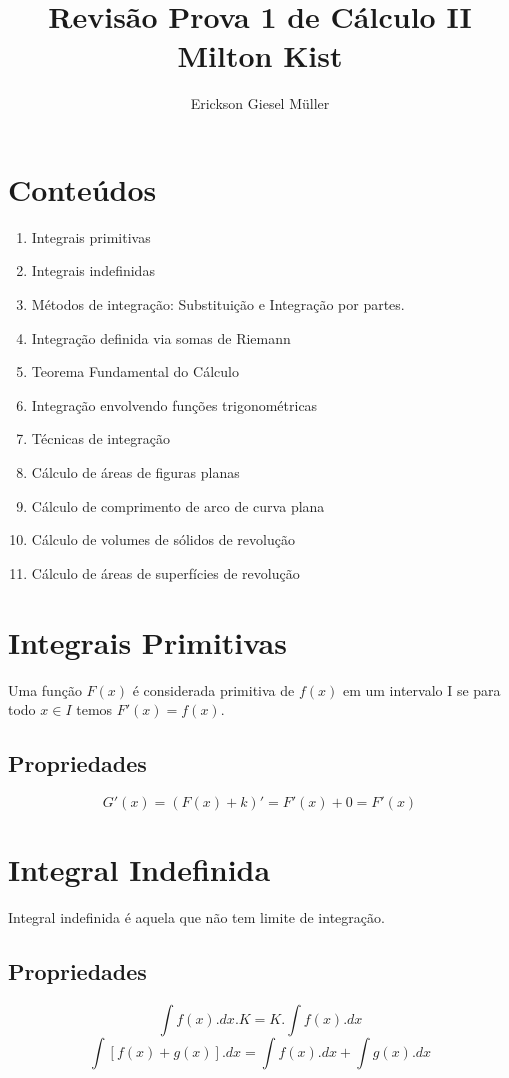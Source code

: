 \documentclass{article}
\title{Revisão Prova 1 de Cálculo II\\Milton Kist}
\author{Erickson Giesel Müller}
\begin{document}
	\maketitle
	
	\section{Conteúdos}
		\begin{enumerate}
			\item Integrais primitivas
			\item Integrais indefinidas
			\item Métodos de integração: Substituição e Integração por partes.
			\item Integração definida via somas de Riemann
			\item Teorema Fundamental do Cálculo
			\item Integração envolvendo funções trigonométricas
			\item Técnicas de integração
			\item Cálculo de áreas de figuras planas
			\item Cálculo de comprimento de arco de curva plana
			\item Cálculo de volumes de sólidos de revolução
			\item Cálculo de áreas de superfícies de revolução
		\end{enumerate}
	\newpage
	\section{Integrais Primitivas}
		Uma função $F(x)$ é considerada primitiva de $f(x)$ em um intervalo I se para todo $x \in I$ temos $F'(x)=f(x)$.
		\subsection{Propriedades}
			$$G'(x)=(F(x)+k)' = F'(x)+0=F'(x)$$
	\section{Integral Indefinida}
		Integral indefinida é aquela que não tem limite de integração.\\
		\subsection{Propriedades}
			\begin{equation}
			\int f(x).dx.K = K.\int f(x).dx
			\end{equation}
			\begin{equation}
			\int [f(x)+g(x)].dx = \int f(x).dx + \int g(x).dx
			\end{equation}
\end{document}
